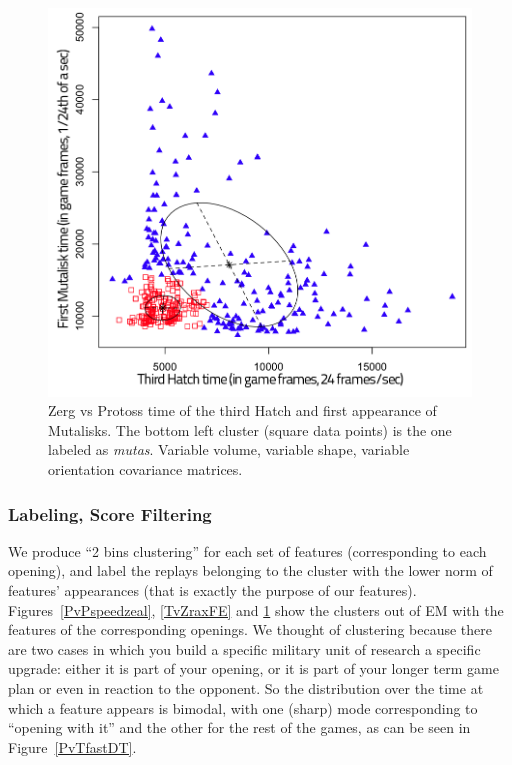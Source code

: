 \begin{figure}[h]
\centerline{\includegraphics[width=0.7\columnwidth]{images/ZvPmutas.png}}
\caption{Zerg vs Protoss time of the third Hatch and first appearance of Mutalisks. The bottom left cluster (square data points) is the one labeled as \textit{mutas}. Variable volume, variable shape, variable orientation covariance matrices.}
\label{ZvPmutas}
\end{figure}



\subsubsection{Labeling, Score Filtering}

We produce ``2 bins clustering'' for each set of features (corresponding to each opening), and label the replays belonging to the cluster with the lower norm of features' appearances (that is exactly the purpose of our features). Figures~\ref{PvPspeedzeal}, \ref{TvZraxFE}
and \ref{ZvPmutas} show the clusters out of EM with the features of the corresponding openings. We thought of clustering because there are two cases in which you build a specific military unit of research a specific upgrade: either it is part of your opening, or it is part of your longer term game plan or even in reaction to the opponent. So the distribution over the time at which a feature appears is bimodal, with one (sharp) mode corresponding to ``opening with it'' and the other for the rest of the games, as can be seen in Figure~\ref{PvTfastDT}.

